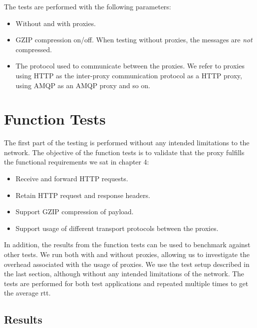 The tests are performed with the following parameters:

\begin{itemize}

    \item Without and with proxies.

    \item GZIP compression on/off. When testing without proxies, the messages
    are \textit{not} compressed.

    \item The protocol used to communicate between the proxies. We refer to
    proxies using HTTP as the inter-proxy communication protocol as a HTTP
    proxy, using AMQP as an AMQP proxy and so on.

\end{itemize}



\section{Function Tests}

The first part of the testing is performed without any intended limitations to
the network. The objective of the function tests is to validate that the proxy
fulfills the functional requirements we sat in chapter 4:

\begin{itemize}
    \item Receive and forward HTTP requests.
    \item Retain HTTP request and response headers.
    \item Support GZIP compression of payload.
    \item Support usage of different transport protocols between the proxies.
\end{itemize}

 In addition, the results from the function tests can be used to benchmark
 against other tests. We run both with and without proxies, allowing us to
 investigate the overhead associated with the usage of proxies. We use the test
 setup described in the last section, although without any intended limitations
 of the network. The tests are performed for both test applications and repeated
 multiple times to get the average \gls{rtt}.

\subsection{Results}

